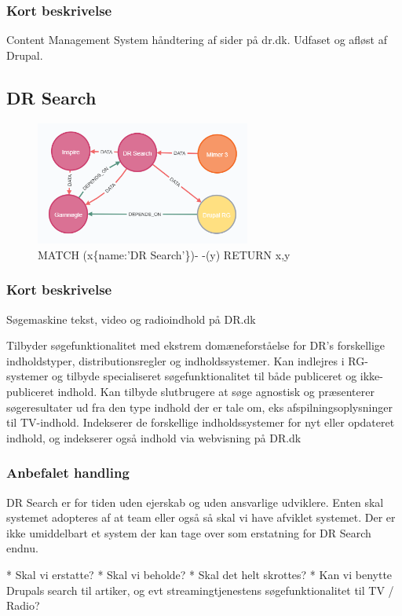 \documentclass{article}
\begin{document}
\subsubsection*{Kort beskrivelse}
Content Management System håndtering af sider på dr.dk. Udfaset og afløst af Drupal.



\subsection{DR Search}
\begin{figure}[h]
\includegraphics[width=200pt]{DRSearch.PNG}
\caption{MATCH (x\{name:'DR Search'\})- -(y) RETURN x,y}
\end{figure}
\subsubsection*{Kort beskrivelse}
Søgemaskine tekst, video og radioindhold på DR.dk	

Tilbyder søgefunktionalitet med ekstrem domæneforståelse for DR's forskellige indholdstyper, distributionsregler og indholdssystemer. Kan indlejres i RG-systemer og tilbyde specialiseret søgefunktionalitet til både publiceret og ikke-publiceret indhold. Kan tilbyde slutbrugere at søge agnostisk og præsenterer søgeresultater ud fra den type indhold der er tale om, eks afspilningsoplysninger til TV-indhold. Indekserer de forskellige indholdssystemer for nyt eller opdateret indhold, og indekserer også indhold via webvisning på DR.dk
\subsubsection*{Anbefalet handling}
DR Search er for tiden uden ejerskab og uden ansvarlige udviklere. Enten skal systemet adopteres af at team eller også så skal vi have afviklet systemet. Der er ikke umiddelbart et system der kan tage over som erstatning for DR Search endnu. 

* Skal vi erstatte?
* Skal vi beholde?
* Skal det helt skrottes?
* Kan vi benytte Drupals search til artiker, og evt streamingtjenestens søgefunktionalitet til TV / Radio?
\end{document}
